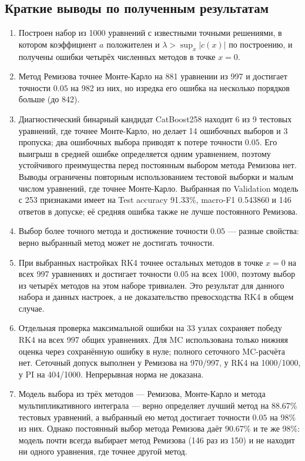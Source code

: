 \documentclass[14pt,a4paper]{extarticle}
\begin{document}
\subsection{Краткие выводы по полученным результатам}
\begin{enumerate}
\item Построен набор из 1000 уравнений с известными точными решениями,
в котором коэффициент $a$ положителен и $\lambda>\sup_x|c(x)|$
по построению, и получены ошибки четырёх численных методов в точке
$x=0$.
\item Метод Ремизова точнее Монте-Карло на 881 уравнении из 997
и достигает точности $0.05$ на 982 из них, но изредка его ошибка
на несколько порядков больше (до 842).
\item Диагностический бинарный кандидат CatBoost258 находит
6 из 9 тестовых уравнений, где точнее
Монте-Карло, но делает 14 ошибочных выборов и 3 пропуска; два ошибочных
выбора приводят к потере точности $0.05$. Его выигрыш в средней ошибке
определяется одним уравнением, поэтому устойчивого преимущества перед
постоянным выбором метода Ремизова нет. Выводы ограничены повторным
использованием тестовой выборки и малым числом уравнений, где точнее
Монте-Карло. Выбранная по Validation модель с 253 признаками
имеет на Test accuracy 91.33\%, macro-F1 0.543860 и 146 ответов
в допуске; её средняя ошибка также не лучше постоянного Ремизова.
\item Выбор более точного метода и достижение точности $0.05$ ---
разные свойства: верно выбранный метод может не достигать точности.
\item При выбранных настройках RK4 точнее остальных методов в точке
$x=0$ на всех 997 уравнениях и достигает точности $0.05$ на всех 1000,
поэтому выбор из четырёх методов на этом наборе тривиален. Это результат
для данного набора и данных настроек, а не доказательство превосходства
RK4 в общем случае.
\item Отдельная проверка максимальной ошибки на 33 узлах сохраняет
победу RK4 на всех 997 общих уравнениях. Для MC использована только
нижняя оценка через сохранённую ошибку в нуле; полного сеточного
MC-расчёта нет. Сеточный допуск выполнен у Ремизова на 970/997,
у RK4 на 1000/1000, у PI на 404/1000. Непрерывная норма не доказана.
\item Модель выбора из трёх методов --- Ремизова, Монте-Карло и метода
мультипликативного интеграла --- верно определяет лучший метод
на 88.67\% тестовых уравнений, а выбранный ею метод достигает точности $0.05$
на 98\% из них. Однако постоянный выбор метода Ремизова даёт 90.67\%
и те же 98\%: модель почти всегда выбирает метод Ремизова (146 раз
из 150) и не находит ни одного уравнения, где точнее другой метод.
\end{enumerate}
\end{document}
